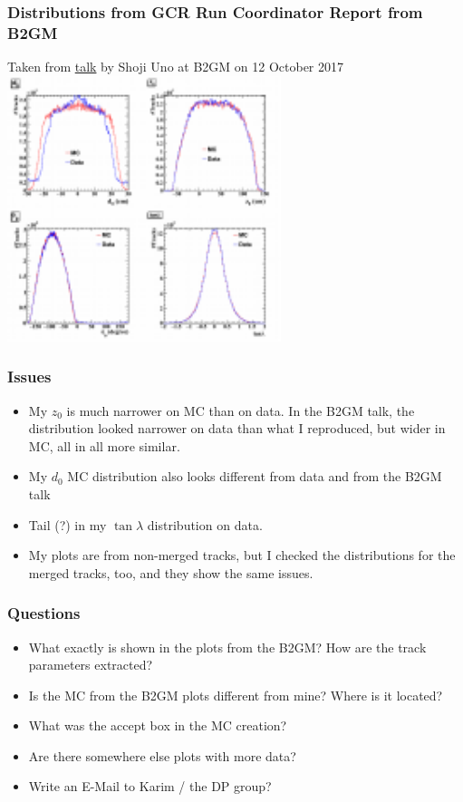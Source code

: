\documentclass[18pt]{beamer}
\begin{document}
\begin{frame}
  \frametitle{Distributions from GCR Run Coordinator Report from B2GM}
  Taken from \href{https://kds.kek.jp/indico/event/25459/session/52/contribution/25/material/slides/0.pptx}{talk} by Shoji Uno at B2GM on 12 October 2017
  \centering
  \includegraphics[width=0.6\textwidth]{figures/trackparam_distributions_from_b2gm_grc_run_coordinator_talk_2017-10-09.pdf}
\end{frame}

\begin{frame}
  \frametitle{Issues}
  \begin{itemize}
  \item My $z_0$ is much narrower on MC than on data. In the B2GM talk, the distribution looked narrower on data than what I reproduced, but wider in MC, all in all more similar.
  \item My $d_0$ MC distribution also looks different from data and from the B2GM talk
  \item Tail (?) in my $\tan \lambda$ distribution on data.
  \item My plots are from non-merged tracks, but I checked the distributions for the merged tracks, too, and they show the same issues.
  \end{itemize}
\end{frame}

\begin{frame}
  \frametitle{Questions}
  \begin{itemize}
  \item What exactly is shown in the plots from the B2GM? How are the track parameters extracted?
  \item Is the MC from the B2GM plots different from mine? Where is it located?
  \item What was the accept box in the MC creation?
  \item Are there somewhere else plots with more data?
  \item Write an E-Mail to Karim / the DP group?
  \end{itemize}
\end{frame}
\end{document}
